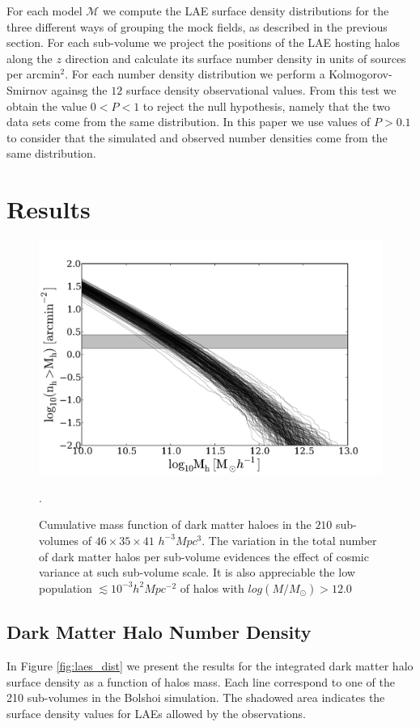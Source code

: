 \documentclass[usenatbib]{mn2e}
\begin{document}
For each model ${\mathcal M}$ we compute the LAE surface density
distributions for the three different ways of grouping the mock
fields, as described in the previous section. For each sub-volume we
project the positions of the LAE hosting halos along the $z$ direction
and calculate its surface number density in units of sources per
arcmin$^{2}$. For each number density distribution we perform a
Kolmogorov-Smirnov againsg the $12$ surface density observational
values. From this test we obtain the value $0<P<1$ to reject the null
hypothesis, namely that the two data sets come from the same
distribution. In this paper we use values of $P>0.1$ to consider that
the simulated and observed number densities come from the same
distribution. 

\section{Results}


\begin{figure}
\begin{center}
\includegraphics[width=1.00\linewidth,angle=0]{./plots/Fig1.pdf}
\caption{ \label{figure:laes_dist} Cumulative mass function of dark
  matter haloes in the $210$ sub-volumes of $46\times 35\times 41$
  $h^{-3}Mpc^{3}$. The variation in the total number of dark matter
  halos per sub-volume  evidences the effect of cosmic variance at
  such sub-volume scale. It is also appreciable the low population
  $\lesssim10^{-3}h^{2}Mpc^{-2}$ of halos with
  $log(M/M_{\odot})>12.0$}. 
\end{center} 
\end{figure}


\subsection{Dark Matter Halo Number Density}
In Figure \ref{fig:laes_dist} we present the results for  the
integrated dark matter halo surface density as a function of halos
mass. Each line correspond to one of the 210 sub-volumes in the
Bolshoi simulation. The shadowed area indicates the surface density
values for LAEs allowed by the observations.  
 
\end{document}
